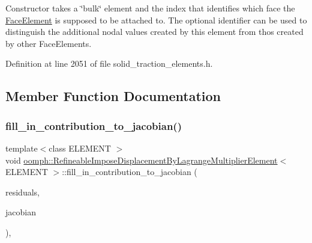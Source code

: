 Constructor takes a \char`\"{}bulk\char`\"{} element and the index that identifies which face the \hyperlink{classoomph_1_1FaceElement}{Face\+Element} is supposed to be attached to. The optional identifier can be used to distinguish the additional nodal values created by this element from thos created by other Face\+Elements. 



Definition at line 2051 of file solid\+\_\+traction\+\_\+elements.\+h.



\subsection{Member Function Documentation}
\mbox{\label{classoomph_1_1RefineableImposeDisplacementByLagrangeMultiplierElement_af0d1b2633de720222d85e2083296a209}} 
\subsubsection{\texorpdfstring{fill\+\_\+in\+\_\+contribution\+\_\+to\+\_\+jacobian()}{fill\_in\_contribution\_to\_jacobian()}}
{\footnotesize\ttfamily template$<$class E\+L\+E\+M\+E\+NT $>$ \\
void \hyperlink{classoomph_1_1RefineableImposeDisplacementByLagrangeMultiplierElement}{oomph\+::\+Refineable\+Impose\+Displacement\+By\+Lagrange\+Multiplier\+Element}$<$ E\+L\+E\+M\+E\+NT $>$\+::fill\+\_\+in\+\_\+contribution\+\_\+to\+\_\+jacobian (\begin{DoxyParamCaption}\item[{\hyperlink{classoomph_1_1Vector}{Vector}$<$ double $>$ \&}]{residuals,  }\item[{\hyperlink{classoomph_1_1DenseMatrix}{Dense\+Matrix}$<$ double $>$ \&}]{jacobian }\end{DoxyParamCaption})\hspace{0.3cm}{\ttfamily [inline]}, {\ttfamily [virtual]}}



